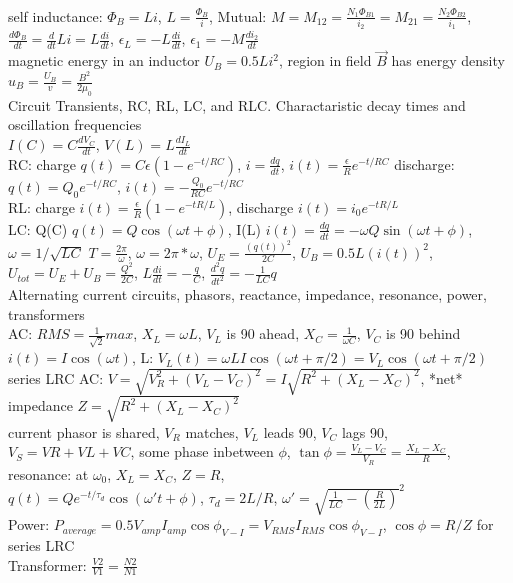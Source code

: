 \documentclass{article}
\begin{document}
\\self inductance: $\Phi_B=Li$, $L=\frac{\Phi_B}{i}$, Mutual: $M=M_{12}=\frac{N_1\Phi_{B1}}{i_2}=M_{21}=\frac{N_2\Phi_{B2}}{i_1}$, $\frac{d\Phi_B}{dt}=\frac{d}{dt}Li=L\frac{di}{dt}$, $\epsilon_L=-L\frac{di}{dt}$, $\epsilon_1=-M\frac{di_2}{dt}$
\\magnetic energy in an inductor $U_B=0.5Li^2$, region in field $\vec B$ has energy density $u_B=\frac{U_B}{v}=\frac{B^2}{2\mu_0}$
\\\indent Circuit Transients, RC, RL, LC, and RLC. Charactaristic decay times and oscillation frequencies
\\$I(C)=C\frac{dV_C}{dt}$, $V(L)=L\frac{dI_L}{dt}$
\\RC: charge $q(t)=C\epsilon(1-e^{-t/RC})$, $i=\frac{dq}{dt}$, $i(t)=\frac{\epsilon}{R}e^{-t/RC}$ discharge: $q(t)=Q_0e^{-t/RC}$, $i(t)=-\frac{Q_0}{RC}e^{-t/RC}$
\\RL: charge $i(t)=\frac{\epsilon}{R}(1-e^{-tR/L})$, discharge $i(t)=i_0e^{-tR/L}$
\\LC: Q(C) $q(t)=Q\cos(\omega t+\phi)$, I(L) $i(t)=\frac{dq}{dt}=-\omega Q\sin(\omega t+\phi)$, $\omega=1/\sqrt{LC}$ $T=\frac{2\pi}{\omega}$, $\omega=2\pi*\omega$, $U_E=\frac{(q(t))^2}{2C}$, $U_B=0.5L(i(t))^2$, $U_{tot}=U_E+U_B=\frac{Q^2}{2C}$, $L\frac{di}{dt}=-\frac{q}{C}$, $\frac{d^2q}{dt^2}=-\frac{1}{LC}q$
\\\indent Alternating current circuits, phasors, reactance, impedance, resonance, power, transformers
\\AC: $RMS=\frac{1}{\sqrt{2}} max$, $X_L=\omega L$, $V_L$ is 90 ahead, $X_C=\frac{1}{\omega C}$, $V_C$ is 90 behind
\\$i(t)=I\cos(\omega t)$,  L: $V_L(t)=\omega LI\cos(\omega t+\pi/2)=V_L\cos(\omega t+\pi/2)$
\\series LRC AC: $V=\sqrt{V_R^2+(V_L-V_C)^2}=I\sqrt{R^2+(X_L-X_C)^2}$, *net* impedance $Z=\sqrt{R^2+(X_L-X_C)^2}$
\\current phasor is shared, $V_R$ matches, $V_L$ leads 90, $V_C$ lags 90, $V_S=VR+VL+VC$, some phase inbetween $\phi$, $\tan\phi=\frac{V_L-V_C}{V_R}=\frac{X_L-X_C}{R}$, resonance: at $\omega_0$, $X_L=X_C$, $Z=R$, 
\\$q(t)=Qe^{-t/\tau_d}\cos(\omega't+\phi)$, $\tau_d=2L/R$, $\omega'=\sqrt{\frac{1}{LC}-(\frac{R}{2L})}^2$
\\Power: $P_{average}=0.5V_{amp}I_{amp}\cos\phi_{V-I}=V_{RMS}I_{RMS}\cos\phi_{V-I}$, $\cos\phi=R/Z$ for series LRC
\\Transformer: $\frac{V2}{V1}=\frac{N2}{N1}$
\\
\end{document}
